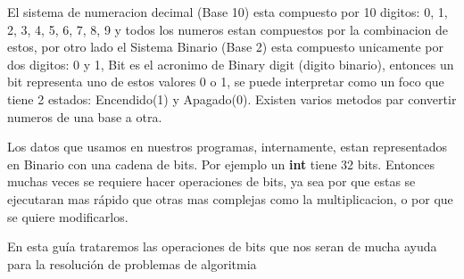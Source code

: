 El sistema de numeracion decimal (Base 10) esta compuesto por 10 digitos: 0, 1, 2, 3, 4, 5, 6, 7, 8, 9
 y todos los numeros estan compuestos por la combinacion de estos, por otro lado el Sistema Binario
(Base 2) esta compuesto unicamente por dos digitos: 0 y 1, Bit es el acronimo de Binary digit (digito
 binario), entonces un bit representa uno de estos valores 0 o 1, se puede interpretar como un foco
que tiene 2 estados: Encendido(1) y Apagado(0). Existen varios metodos par convertir numeros de
una base a otra.

Los datos que usamos en nuestros programas, internamente, estan representados en Binario con
una cadena de bits. Por ejemplo un \textbf{int} tiene 32 bits. Entonces muchas veces se requiere hacer
operaciones de bits, ya sea por que estas se ejecutaran mas rápido que otras mas complejas como la
multiplicacion, o por que se quiere modificarlos.

En esta guía trataremos las operaciones de bits que nos seran de mucha ayuda para la resolución
de problemas de algoritmia